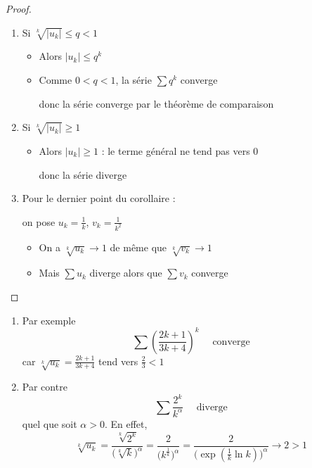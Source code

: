 \begin{frame}
\begin{proof}
\begin{enumerate}
\item\pause Si $\sqrt[k]{|u_k|} \le q<1$
\begin{itemize}
\item\pause Alors $|u_k| \le q^k$
\item\pause Comme $0<q<1$, la série $\sum q^k$ converge

\pause
donc la série converge par le théorème de comparaison
\end{itemize}  
\item\pause Si $\sqrt[k]{|u_k|} \ge 1$
\begin{itemize}
\item\pause Alors $|u_k| \ge 1$ : le terme général ne tend pas vers $0$

\pause
donc la série diverge
\end{itemize}  
\item\pause Pour le dernier point du corollaire :

\pause
on pose $u_k=\frac{1}{k}$, $v_k=\frac{1}{k^2}$
\begin{itemize}
\item\pause On a $\sqrt[k]{u_k}\to 1$ de même que $\sqrt[k]{v_k}\to 1$
\item\pause Mais $\sum u_k$ diverge alors que $\sum v_k$ converge
\end{itemize}  
\end{enumerate}
\end{proof}
\end{frame}


\begin{frame}
\begin{exemple}
\begin{enumerate}
  \item Par exemple
$$\sum \left(\frac{2k+1}{3k+4}\right)^k\quad \text{ converge}$$
\pause
car $\sqrt[k]{u_k} = \frac{2k+1}{3k+4}$ tend vers $\frac{2}{3}<1$
  
  
  \item\pause Par contre  
  $$\sum \frac{2^k}{k^\alpha}\quad \text{ diverge}$$
  quel que soit $\alpha >0$. \pause
  En effet,
  $$\sqrt[k]{u_k} = \frac{\sqrt[k]{2^k}}{\big(\sqrt[k]{k}\big)^\alpha}
  = \frac{2}{\big(k^\frac{1}{k}\big)^\alpha}
  = \frac{2}{\big(\exp(\frac{1}{k}\ln k)\big)^\alpha} \to 2>1$$
\end{enumerate}
\end{exemple}
\end{frame}

